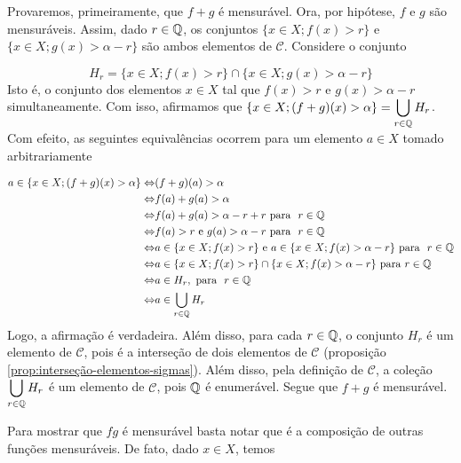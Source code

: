 \begin{prova}
    
    Provaremos, primeiramente, que $f+g$ é mensurável. Ora, por hipótese, $f$ e $g$ são mensuráveis. Assim, dado $r \in \operatorname{\mathbb{Q}}$, os conjuntos $\{x \in X; f(x) > r\}$ e 
        $\{x \in X; g(x) > \alpha -r\}$ são ambos elementos de $\mathcal{C}$.
        Considere o conjunto  
        
        $$H_r = \{x \in X; f(x) > r\} \cap \{x \in X; g(x) > \alpha -r\}$$
        Isto é, o conjunto dos elementos $x \in X$ tal que $f(x) 
        > r$ e $g(x) >\alpha -r$ simultaneamente.
        Com isso, afirmamos que $\{x \in X; (f+g)(x) > \alpha\} = \displaystyle \bigcup_{r \in \operatorname{\mathbb{Q}}} H_r$. Com efeito, as seguintes equivalências ocorrem para um elemento $a \in X$ tomado arbitrariamente

        \begin{align*}
            a \in \{x \in X; (f+g)(x) > \alpha\} 
            \Leftrightarrow  & (f+g)(a) >\alpha \\
            \Leftrightarrow & f(a) +g(a) > \alpha \\
            \Leftrightarrow & f(a) + g(a) > \alpha -r + r\ \textrm{para } \ r \in \Q\\
            \Leftrightarrow & f(a) > r \textrm{\ e\ } g(a) > \alpha -r\ \textrm{para  } \ r \in \Q\\
            \Leftrightarrow & a \in \{x \in X; f(x) > r\} \textrm{\ e\ } a \in \{x \in X; f(x) > \alpha - r\}\  \textrm{para  } \ r \in \Q\\
            \Leftrightarrow & a \in \{x \in X; f(x) > r\} \cap \{x \in X; f(x) > \alpha - r\}\  \textrm{para  }  r \in \Q\\
            \Leftrightarrow & a \in H_r,\ \textrm{para  } \ r \in \Q\\
            \Leftrightarrow &a \in \bigcup_{r \in \Q} H_r
        \end{align*}
    Logo, a afirmação é verdadeira. Além disso, para cada $r \in \operatorname{\mathbb{Q}}$, o conjunto $H_r$ é um elemento de $\mathcal{C}$, pois é  a interseção de dois elementos de $\mathcal{C}$ (proposição \ref{prop:interseção-elementos-sigmas}).
    Além disso, pela definição de $\mathcal{C}$, a coleção $\displaystyle \bigcup_{r \in \operatorname{\mathbb{Q}}} H_r$ é um elemento de $\mathcal{C}$, pois $\operatorname{\mathbb{Q}}$ é enumerável.
    Segue que $f+g$ é mensurável.

    Para mostrar que $fg$ é mensurável basta notar que é a composição de outras funções mensuráveis.
    De fato, dado $x \in X$, temos


\end{prova}
